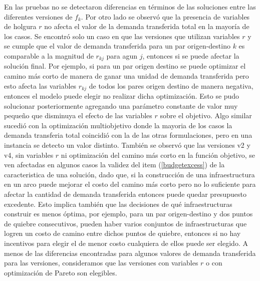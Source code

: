 \documentclass{article}
\begin{document}
  En las pruebas no se detectaron diferencias en términos de las soluciones entre las diferentes versiones de $f_k$. Por otro lado se observó que la presencia de variables de holgura $r$ no afecta el valor de la demanda transferida total en la mayoría de los casos. Se encontró solo un caso en que las versiones que utilizan variables $r$ y se cumple que el valor de demanda transferida para un par origen-destino $k$ es comparable a la magnitud de $r_{kj}$ para agun $j$, entonces si se puede afectar la solución final. Por ejemplo, si para un par origen destino se puede optimizar el camino más corto de manera de ganar una unidad de demanda transferida pero esto afecta las variables $r_{kj}$ de todos los pares origen destino de manera negativa, entonces el modelo puede elegir no realizar dicha optimización. Esto se pudo solucionar posteriormente agregando una parámetro constante de valor muy pequeño que disminuya el efecto de las variables $r$ sobre el objetivo.
  Algo similar sucedió con la optimización multiobjetivo donde la mayoria de los casos la demanda transferia total coincidió con la de las otras formulaciones, pero en una instancia se detecto un valor distinto.
  También se observó que las versiones v2 y v4, sin variables $r$ ni optimización del camino más corto en la función objetivo, se ven afectadas en algunos casos la validez del item (\ref{budgetexcess}) de la caracteristica de una solución, dado que, si la construcción de una infraestructura en un arco puede mejorar el costo del camino más corto pero no lo suficiente para afectar la cantidad de demanda transferida entonces puede quedar presupuesto excedente. Esto implica también que las decisiones de qué infraestructuras construir es menos óptima, por ejemplo, para un par origen-destino y dos puntos de quiebre consecutivos, pueden haber varios conjuntos de infraestructuras que logren un costo de camino entre dichos puntos de quiebre, entonces si no hay incentivos para elegir el de menor costo cualquiera de ellos puede ser elegido.
  A menos de las diferencias encontradas para algunos valores de demanda transferida para las versiones, consideramos que las versiones con variables $r$ o con optimización de Pareto son elegibles.
\end{document}
